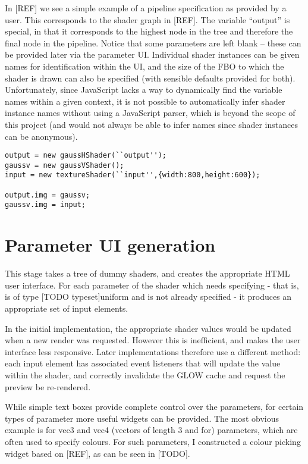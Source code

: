 \documentclass[12pt,twoside,notitlepage]{report}
\begin{document}
In [REF] we see a simple example of a pipeline specification as provided by a user. This corresponds to the shader graph in [REF]. The variable ``output'' is special, in that it corresponds to the highest node in the tree and therefore the final node in the pipeline. Notice that some parameters are left blank -- these can be provided later via the parameter UI. Individual shader instances can be given names for identification within the UI, and the size of the FBO to which the shader is drawn can also be specified (with sensible defaults provided for both). Unfortunately, since JavaScript lacks a way to dynamically find the variable names within a given context, it is not possible to automatically infer shader instance names without using a JavaScript parser, which is beyond the scope of this project (and would not always be able to infer names since shader instances can be anonymous).
\begin{verbatim}
output = new gaussHShader(``output'');
gaussv = new gaussVShader();
input = new textureShader(``input'',{width:800,height:600});

output.img = gaussv;
gaussv.img = input;
\end{verbatim}
\section{Parameter UI generation}
This stage takes a tree of dummy shaders, and creates the appropriate HTML user interface. For each parameter of the shader which needs specifying - that is, is of type [TODO typeset]uniform and is not already specified - it produces an appropriate set of input elements. 

In the initial implementation, the appropriate shader values would be updated when a new render was requested. However this is inefficient, and makes the user interface less responsive. Later implementations therefore use a different method: each input element has associated event listeners that will update the value within the shader, and correctly invalidate the GLOW cache and request the preview be re-rendered.

While simple text boxes provide complete control over the parameters, for certain types of parameter more useful widgets can be provided. The most obvious example is for vec3 and vec4 (vectors of length 3 and for) parameters, which are often used to specify colours. For such parameters, I constructed a colour picking widget based on [REF], as can be seen in [TODO].
\end{document}
